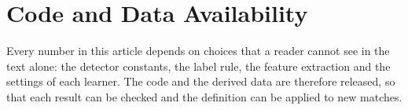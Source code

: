 %

\section{Code and Data Availability}\label{sec:availability}

Every number in this article depends on choices that a reader cannot see in the text alone: the
detector constants, the label rule, the feature extraction and the settings of each learner.
The code and the derived data are therefore released, so that each result can be checked and the
definition can be applied to new matches.

